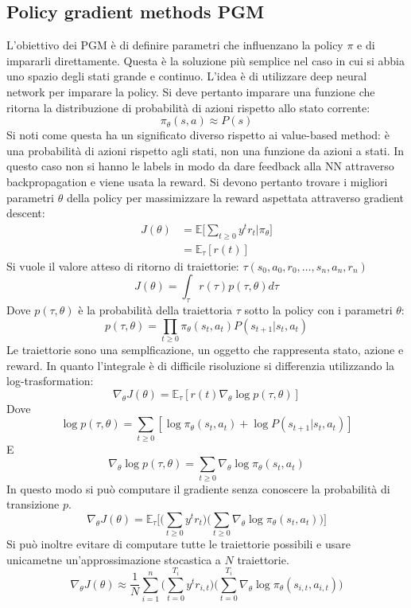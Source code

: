 	\subsection{Policy gradient methods PGM}
	L'obiettivo dei PGM \`e di definire parametri che influenzano la policy $\pi$ e di impararli direttamente.
	Questa \`e la soluzione pi\`u semplice nel caso in cui si abbia uno spazio degli stati grande e continuo.
	L'idea \`e di utilizzare deep neural network per imparare la policy.
	Si deve pertanto imparare una funzione che ritorna la distribuzione di probabilit\`a di azioni rispetto allo stato corrente:
	$$\pi_\theta(s,a)\approx P(s)$$
	Si noti come questa ha un significato diverso rispetto ai value-based method: \`e una probabilit\`a di azioni rispetto agli stati, non una funzione da azioni a stati.
	In questo caso non si hanno le labels in modo da dare feedback alla NN attraverso backpropagation e viene usata la reward.
	Si devono pertanto trovare i migliori parametri $\theta$ della policy per massimizzare la reward aspettata attraverso gradient descent:
	\begin{align*}
		J(\theta) &= \mathbb{E}\biggl[\sum\limits_{t\ge 0}y^tr_t|\pi_\theta\biggr]\\
	  		 &=\mathbb{E}_\tau[r(t)]
	\end{align*}
	Si vuole il valore atteso di ritorno di traiettorie: $\tau(s_0,a_0,r_0, \dots, s_n,a_n,r_n)$
	$$J(\theta) = \int_\tau r(\tau)p(\tau,\theta)d\tau$$
	Dove $p(\tau,\theta)$ \`e la probabilit\`a della traiettoria $\tau$ sotto la policy con i parametri $\theta$:
	$$p(\tau,\theta) = \prod\limits_{t\ge 0}\pi_\theta(s_t,a_t)P(s_{t+1}|s_t,a_t)$$
	Le traiettorie sono una semplficazione, un oggetto che rappresenta stato, azione e reward.
	In quanto l'integrale \`e di difficile risoluzione si differenzia utilizzando la log-trasformation:
	$$\nabla_\theta J(\theta) =\mathbb{E}_\tau[r(t)\nabla_\theta\log p(\tau,\theta)]$$
	Dove
	$$\log p(\tau,\theta) = \sum\limits_{t\ge 0} [\log \pi_\theta(s_t,a_t) + \log P(s_{t+1}|s_t,a_t)]$$
	E
	$$\nabla_\theta \log p(\tau,\theta) = \sum\limits_{t\ge 0}\nabla_\theta \log\pi_\theta(s_t,a_t)$$
	In questo modo si pu\`o computare il gradiente senza conoscere la probabilit\`a di transizione $p$.
	$$\nabla_\theta J(\theta) = \mathbb{E}_\tau\biggl[\biggl(\sum\limits_{t\ge 0}y^tr_t\biggr)\biggl(\sum\limits_{t\ge 0}\nabla_\theta\log\pi_\theta(s_t,a_t)\biggr)\biggr]$$
	Si pu\`o inoltre evitare di computare tutte le traiettorie possibili e usare unicametne un'approssimazione stocastica a $N$ traiettorie.
	$$\nabla_\theta J(\theta) \approx \dfrac{1}{N}\sum\limits_{i=1}^n\biggl(\sum\limits_{t = 0}^{T_i}y^tr_{i,t}\biggr)\biggl(\sum\limits_{t= 0}^{T_i}\nabla_\theta\log\pi_\theta(s_{i,t},a_{i,t})\biggr)$$

